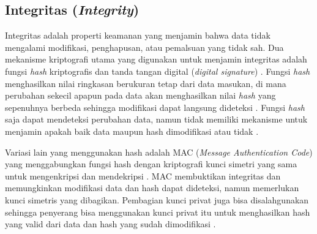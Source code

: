 \subsection{Integritas (\textit{Integrity})}\label{studi-integrity}
Integritas adalah properti keamanan yang menjamin bahwa data tidak mengalami modifikasi, penghapusan, atau pemalsuan yang tidak sah. 
Dua mekanisme kriptografi utama yang digunakan untuk menjamin integritas adalah fungsi \textit{hash} kriptografis dan tanda tangan digital (\textit{digital signature}) \parencite{tripathi2025cia}. 
Fungsi \textit{hash} menghasilkan nilai ringkasan berukuran tetap dari data masukan, di mana perubahan sekecil apapun pada data akan menghasilkan nilai \textit{hash} yang sepenuhnya berbeda sehingga modifikasi dapat langsung dideteksi \parencite{NIST_FIPS186-5}. 
Fungsi \textit{hash} saja dapat mendeteksi perubahan data, namun tidak memiliki mekanisme untuk menjamin apakah baik data maupun hash dimodifikasi atau tidak \parencite{NIST_FIPS186-5}. 

Variasi lain yang menggunakan hash adalah MAC (\textit{Message Authentication Code}) yang menggabungkan fungsi hash dengan kriptografi kunci simetri yang sama untuk mengenkripsi dan mendekripsi \parencite{nistMessageAuthentication}.
MAC membuktikan integritas dan memungkinkan modifikasi data dan hash dapat dideteksi, namun memerlukan kunci simetris yang dibagikan.
Pembagian kunci privat juga bisa disalahgunakan sehingga penyerang bisa menggunakan kunci privat itu untuk menghasilkan hash yang valid dari data dan hash yang sudah dimodifikasi \parencite{NIST_FIPS186-5}.

